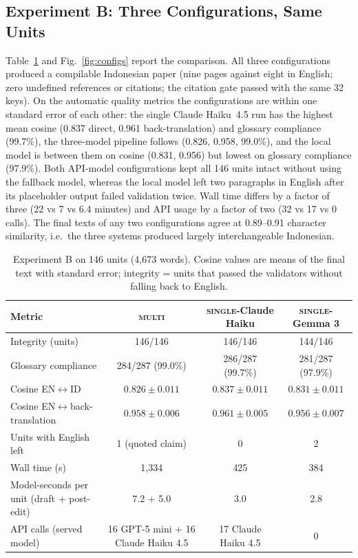\subsection{Experiment B: Three Configurations, Same Units}
Table~\ref{tab:results} and Fig.~\ref{fig:configs} report the comparison. All three configurations produced a compilable Indonesian paper (nine pages against eight in English; zero undefined references or citations; the citation gate passed with the same 32 keys). On the automatic quality metrics the configurations are within one standard error of each other: the single Claude Haiku~4.5 run has the highest mean cosine (0.837 direct, 0.961 back-translation) and glossary compliance (99.7\%), the three-model pipeline follows (0.826, 0.958, 99.0\%), and the local model is between them on cosine (0.831, 0.956) but lowest on glossary compliance (97.9\%). Both API-model configurations kept all 146 units intact without using the fallback model, whereas the local model left two paragraphs in English after its placeholder output failed validation twice. Wall time differs by a factor of three (22 vs 7 vs 6.4 minutes) and API usage by a factor of two (32 vs 17 vs 0 calls). The final texts of any two configurations agree at 0.89--0.91 character similarity, i.e.\ the three systems produced largely interchangeable Indonesian.

\begin{table}[t]
  \caption{Experiment B on 146 units (4{,}673 words). Cosine values are means of the final text with standard error; integrity = units that passed the validators without falling back to English.}
  \label{tab:results}
  \centering
  \footnotesize
  \begin{tabular}{@{}lccc@{}}
    \toprule
    Metric & \textsc{multi} & \textsc{single}-Claude Haiku & \textsc{single}-Gemma 3 \\
    \midrule
    Integrity (units) & 146/146 & 146/146 & 144/146 \\
    Glossary compliance & 284/287 (99.0\%) & 286/287 (99.7\%) & 281/287 (97.9\%) \\
    Cosine EN$\leftrightarrow$ID & $0.826\pm0.011$ & $0.837\pm0.011$ & $0.831\pm0.011$ \\
    Cosine EN$\leftrightarrow$back-translation & $0.958\pm0.006$ & $0.961\pm0.005$ & $0.956\pm0.007$ \\
    Units with English left & 1 (quoted claim) & 0 & 2 \\
    Wall time (s) & 1{,}334 & 425 & 384 \\
    Model-seconds per unit (draft + post-edit) & 7.2 + 5.0 & 3.0 & 2.8 \\
    API calls (served model) & 16 GPT-5 mini + 16 Claude Haiku 4.5 & 17 Claude Haiku 4.5 & 0 \\
    \bottomrule
  \end{tabular}
\end{table}

